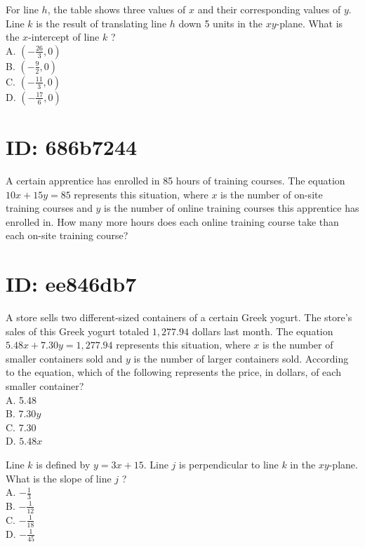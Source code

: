 For line $h$, the table shows three values of $x$ and their corresponding values of $y$. Line $k$ is the result of translating line $h$ down 5 units in the $x y$-plane. What is the $x$-intercept of line $k$ ?\\
A. $\left(-\frac{26}{3}, 0\right)$\\
B. $\left(-\frac{9}{2}, 0\right)$\\
C. $\left(-\frac{11}{3}, 0\right)$\\
D. $\left(-\frac{17}{6}, 0\right)$











\section*{ID: 686b7244}
A certain apprentice has enrolled in 85 hours of training courses. 
The equation $10 x+15 y=85$ represents this situation, where $x$ is 
the number of on-site training courses and $y$ is the number of 
online training courses this apprentice has enrolled in. How many 
more hours does each online training course take than each on-site 
training course?










\section*{ID: ee846db7}
A store sells two different-sized containers of a certain Greek 
yogurt. The store's sales of this Greek yogurt totaled $1,277.94$ 
dollars last month. The equation $5.48 x+7.30 y=1,277.94$ represents 
this situation, where $x$ is the number of smaller containers sold 
and $y$ is the number of larger containers sold. According to the 
equation, which of the following represents the price, in dollars, 
of each smaller container?\\
A. 5.48\\
B. $7.30 y$\\
C. 7.30\\
D. $5.48 x$








Line $k$ is defined by $y=3 x+15$. Line $j$ is perpendicular 
to line $k$ in the $x y$-plane. What is the slope of line $j$ ?\\
A. $-\frac{1}{3}$\\
B. $-\frac{1}{12}$\\
C. $-\frac{1}{18}$\\
D. $-\frac{1}{45}$









